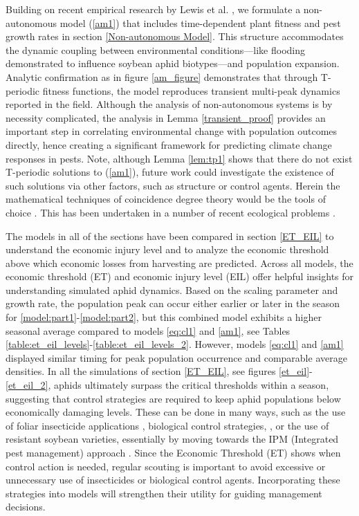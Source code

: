 \documentclass[sn-mathphys-num]{sn-jnl}
\numberwithin{equation}{section}
\numberwithin{equation}{section}
\begin{document}
Building on recent empirical research by Lewis et al. \cite{lewis2025host}, we formulate a non-autonomous model (\ref{am1}) that includes time-dependent plant fitness and pest growth rates in section \ref{Non-autonomous Model}. This structure accommodates the dynamic coupling between environmental conditions—like flooding demonstrated to influence soybean aphid biotypes—and population expansion. Analytic confirmation as in figure \ref{am_figure} demonstrates that through T-periodic fitness functions, the model reproduces transient multi-peak dynamics reported in the field. Although the analysis of non-autonomous systems is by necessity complicated, the analysis in Lemma \ref{transient_proof} provides an important step in correlating environmental change with population outcomes directly, hence creating a significant framework for predicting climate change responses in pests. Note, although Lemma \ref{lem:tp1} shows that there do not exist T-periodic solutions to (\ref{am1}), future work could investigate the existence of such solutions via other factors, such as structure or control agents. Herein the mathematical techniques of coincidence degree theory would be the tools of choice \cite{mawhin2006topological}. This has been undertaken in a number of recent ecological problems \cite{srivastava2023periodic, srivastava2025existence}.

The models in all of the sections have been compared in section \ref{ET_EIL} to understand the economic injury level and to analyze the economic threshold above which economic losses from harvesting are predicted. Across all models, the economic threshold (ET) and economic injury level (EIL) offer helpful insights for understanding simulated aphid dynamics. Based on the scaling parameter and growth rate, the population peak can occur either earlier or later in the season for \eqref{model:part1}-\eqref{model:part2}, but this combined model exhibits a higher seasonal average compared to models  \eqref{eq:cl1} and \eqref{am1}, see Tables \ref{table:et_eil_levels}-\ref{table:et_eil_levels_2}. However, models \eqref{eq:cl1} and \eqref{am1} displayed similar timing for peak population occurrence and comparable average densities. In all the simulations of section \ref{ET_EIL}, see figures \ref{et_eil}-\ref{et_eil_2}, aphids ultimately surpass the critical thresholds within a season, suggesting that control strategies are required to keep aphid populations below economically damaging levels. These can be done in many ways, such as the use of foliar insecticide applications \cite{ragsdale2011ecology}, biological control strategies, \cite{costamagna2006predators,lin2003effect,miksanek2019matrix}, or the use of resistant soybean varieties, essentially by moving towards the IPM (Integrated pest management) approach \cite{verma2025towards}. Since the Economic Threshold (ET) shows when control action is needed,   regular scouting is important to avoid excessive or unnecessary use of insecticides or biological control agents.  Incorporating these strategies into models will strengthen their utility for guiding management decisions.
\end{document}
